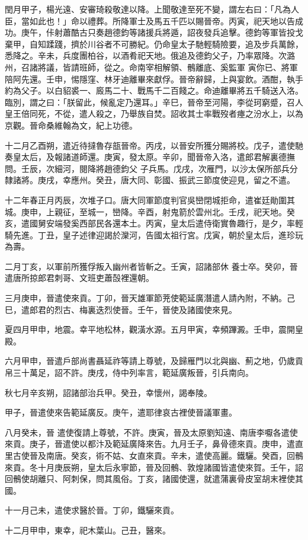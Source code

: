 \begin{pinyinscope}
 閏月甲子，楊光遠、安審琦殺敬達以降。上聞敬達至死不變，謂左右曰：「凡為人臣，當如此也！」命以禮葬。所降軍士及馬五千匹以賜晉帝。丙寅，祀天地以告成功。庚午，佧射蕭酷古只奏趙德鈞等諸援兵將遁，詔夜發兵追擊。德鈞等軍皆投戈棄甲，自知蹂踐，擠於川谷者不可勝紀。仍命皇太子馳輕騎險要，追及步兵萬餘，悉降之。辛未，兵度團柏谷，以酒肴祀天地。俄追及德鈞父子，乃率眾降。次潞州，召諸將議，皆請班師，從之。命南宰相解領、鶻離底、奚監軍
 寅你已、將軍陪阿先還。壬申，惕隱窪、林牙迪離畢來獻俘。晉帝辭歸，上與宴飲。酒酣，執手約為父子。以白貂裘一、廄馬二十、戰馬千二百餞之。命迪離畢將五千騎送入洛。臨別，謂之曰：「朕留此，候亂定乃還耳。」辛巳，晉帝至河陽，李從珂窮蹙，召人皇王倍同死，不從，遣人殺之，乃舉族自焚。詔收其士率戰歿者瘞之汾水上，以為京觀。晉命桑維翰為文，紀上功德。



 十二月乙酉朔，遣近待撻魯存瓿晉帝。丙戌，以晉安所獲分賜將校。戊子，遣使馳奏皇太后，及報諸道師還。庚寅，發太原。辛卯，聞晉帝入洛，遣郎君解裏德撫問。壬辰，次細河，閱降將趙德鈞父
 子兵馬。戊戌，次雁門，以沙太保所部兵分隸諸將。庚戌，幸應州。癸丑，唐大同、彰國、振武三節度使迎見，留之不遣。



 十二年春正月丙辰，次堆子口。唐大同軍節度判官吳巒閉城拒命，遣崔廷勛圍其城。庚申，上親征，至城一，巒降。辛酉，射鬼箭於雲州北。壬戌，祀天地。癸亥，遣國舅安端發奚西部民各還本土。丙寅，皇太后遣侍衛實魯趣行，是夕，率輕騎先進。丁丑，皇子述律迎謁於灤河，告國太祖行宮。戊寅，朝於皇太后，進珍玩為壽。



 二月丁亥，以軍前所獲俘叛入幽州者皆斬之。壬寅，詔諸部休
 養士卒。癸卯，晉遣唐所掠郎君刺哥、文班吏蕭嗀裡還朝。



 三月庚申，晉遣使來貢。丁卯，晉天雄軍節茺使範延廣潛遣人請內附，不納。己巳，遣郎君的烈古、梅裏迭烈使晉。壬午，晉使及諸國使來見。



 夏四月甲申，地震。幸平地松林，觀潢水源。五月甲寅，幸頻蹕澱。壬申，震開皇殿。



 六月甲申，晉遣戶部尚書聶延祚等請上尊號，及歸雁門以北與幽、薊之地，仍歲貢帛三十萬足，詔不許。庚戌，侍中列率言，範延廣叛晉，引兵南向。



 秋七月辛亥朔，詔諸部治兵甲。癸丑，幸懷州，謁奉陵。



 甲子，晉遣使來告範延廣反。庚午，遣耶律哀古裡使晉議軍畫。



 八月癸未，晉
 遣使復請上尊號，不許。庚寅，晉及太原劉知遠、南唐李嚈各遣使來貢。庚子，晉遣使以都汴及範延廣降來告。九月壬子，鼻骨德來貢。庚申，遣直里古使晉及南唐。癸亥，術不姑、女直來貢。辛未，遣使高麗。鐵驪。癸酉，回鶻來貢。冬十月庚辰朔，皇太后永寧節，晉及回鶻、敦煌諸國皆遣使來賀。壬午，詔回鶻使胡離只、阿刺保，問其風俗。丁亥，諸國使還，就遣蒲裏骨皮室胡末裡使其國。



 十一月己未，遣使求醫於晉。丁卯，鐵驪來貢。



 十二月甲申，東幸，祀木葉山。己丑，醫來。



\end{pinyinscope}